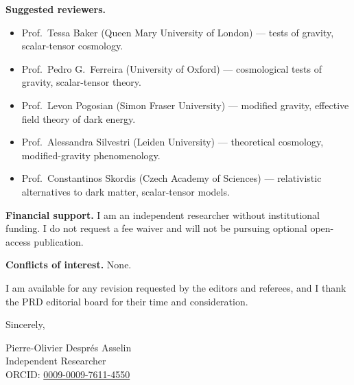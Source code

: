 \documentclass[11pt]{article}
\begin{document}
\textbf{Suggested reviewers.}
\begin{itemize}
  \item Prof.\ Tessa Baker (Queen Mary University of London) ---
    tests of gravity, scalar-tensor cosmology.
  \item Prof.\ Pedro G.\ Ferreira (University of Oxford) ---
    cosmological tests of gravity, scalar-tensor theory.
  \item Prof.\ Levon Pogosian (Simon Fraser University) ---
    modified gravity, effective field theory of dark energy.
  \item Prof.\ Alessandra Silvestri (Leiden University) ---
    theoretical cosmology, modified-gravity phenomenology.
  \item Prof.\ Constantinos Skordis (Czech Academy of Sciences) ---
    relativistic alternatives to dark matter, scalar-tensor models.
\end{itemize}

\bigskip

\textbf{Financial support.}
I am an independent researcher without institutional funding. I do
not request a fee waiver and will not be pursuing optional
open-access publication.

\bigskip

\textbf{Conflicts of interest.}
None.

\bigskip

I am available for any revision requested by the editors and
referees, and I thank the PRD editorial board for their time and
consideration.

\bigskip

Sincerely,

\bigskip

\noindent
Pierre-Olivier Despr\'{e}s Asselin \\
Independent Researcher \\
ORCID: \href{https://orcid.org/0009-0009-7611-4550}{0009-0009-7611-4550}
\end{document}
